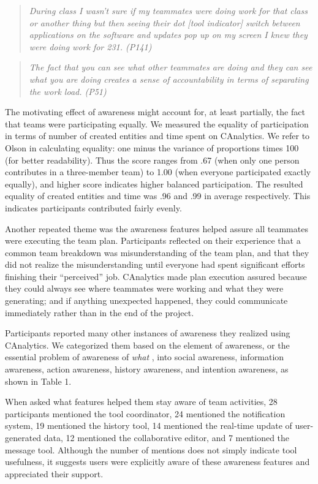 \begin{quote}
\emph{During class I wasn't sure if my teammates were doing work for that
class or another thing but then seeing their dot {[}tool indicator{]}
switch between applications on the software and updates pop up on my
screen I knew they were doing work for 231. (P141)}
\end{quote}

\begin{quote}
\emph{The fact that you can see what other teammates are doing and they can
see what you are doing creates a sense of accountability in terms of
separating the work load. (P51)}
\end{quote}

The motivating effect of awareness might account for, at least partially,
the fact that teams were participating equally. We measured the equality of
participation in terms of number of created entities and time spent on
CAnalytics. We refer to Olson \cite{Olson2017} in calculating equality: one
minus the variance of proportions times 100 (for better readability). Thus
the score ranges from .67 (when only one person contributes in a three-member
team) to 1.00 (when everyone participated exactly equally), and higher
score indicates higher balanced participation. The resulted equality of
created entities and time was .96 and .99 in average respectively. This
indicates participants contributed fairly evenly.

Another repeated theme was the awareness features helped assure all teammates were executing
the team plan. Participants reflected on their experience that a common
team breakdown was misunderstanding of the team plan, and that they did
not realize the misunderstanding until everyone had spent significant efforts
finishing their ``perceived'' job. CAnalytics made plan execution assured
because they could always see where teammates were working and what they
were generating; and if anything unexpected happened, they could communicate
immediately rather than in the end of the project.

Participants reported many other instances of awareness they realized
using CAnalytics. We categorized them based on the element of awareness,
or the essential problem of awareness of \emph{what}
\cite{Schmidt2002}, into social awareness, information awareness,
action awareness, history awareness, and intention awareness, as shown
in Table 1.

When asked what features helped them stay aware of team activities, 28
participants mentioned the tool coordinator, 24 mentioned the
notification system, 19 mentioned the history tool, 14 mentioned the
real-time update of user-generated data, 12 mentioned the collaborative
editor, and 7 mentioned the message tool. Although the number of mentions
does not simply indicate tool usefulness, it suggests users were explicitly aware of these awareness features and appreciated their support.


